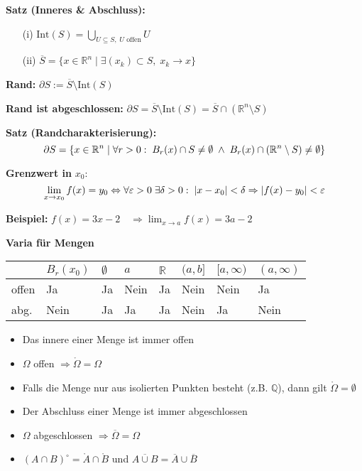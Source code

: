 \begin{itemize}
\textbf{Satz (Inneres \& Abschluss):}
\begin{itemize}
  \item[(i)] \(\displaystyle \text{Int}(S) = \bigcup_{U \subseteq S,\; U \text{ offen}} U\)
  \item[(ii)] \(\displaystyle \overline{S} = \{x \in \mathbb{R}^n \mid \exists (x_k) \subset S,\; x_k \to x\}\)
\end{itemize}

\textbf{Rand:}  
\(\partial S := \overline{S} \setminus \text{Int}(S)\)

\textbf{Rand ist abgeschlossen:}  
\(\partial S = \overline{S} \setminus \text{Int}(S) = \overline{S} \cap (\mathbb{R}^n \setminus S)\)

\textbf{Satz (Randcharakterisierung):}  
\[
\partial S = \{x \in \mathbb{R}^n \mid \forall r > 0: \\
\; B_r(x) \cap S \ne \emptyset \;\land\; B_r(x) \cap (\mathbb{R}^n \setminus S) \ne \emptyset \}
\]


\textbf{Grenzwert in } $x_0$:  
\[
\lim_{x \to x_0} f(x) = y_0 \Leftrightarrow
\forall \varepsilon > 0\; \exists \delta > 0: \\
\; |x - x_0| < \delta \Rightarrow |f(x) - y_0| < \varepsilon
\]

\textbf{Beispiel:}  
$f(x) = 3x - 2 \quad \Rightarrow \lim_{x \to a} f(x) = 3a - 2$

\textbf{Varia für Mengen}
\renewcommand{\arraystretch}{1.2}

\begin{center}
\begin{tabularx}{\linewidth}{l 
  >{\centering\arraybackslash}p{0.5cm} 
  >{\centering\arraybackslash}p{0.1cm} 
  >{\centering\arraybackslash}p{0.35cm} 
  >{\centering\arraybackslash}p{0.35cm} 
  >{\centering\arraybackslash}p{0.35cm} 
  >{\centering\arraybackslash}p{0.35cm} 
  >{\centering\arraybackslash}p{0.35cm}}
\toprule
& $B_r(x_0)$ & $\emptyset$ & $a$ & $\mathbb{R}$ & $(a,b]$ & $[a,\infty)$ & $(a,\infty)$ \\
\midrule
offen     & Ja   & Ja  & Nein & Ja  & Nein & Nein & Ja \\
abg. & Nein & Ja  & Ja   & Ja  & Nein & Ja   & Nein \\
\bottomrule
\end{tabularx}
\end{center}
\begin{itemize}[leftmargin=1.5em]
  \item Das innere einer Menge ist immer offen
  \item $\Omega$ offen $\Rightarrow \mathring{\Omega} = \Omega$
  \item Falls die Menge nur aus isolierten Punkten besteht (z.B. $\mathbb{Q}$), dann gilt $\mathring{\Omega} = \emptyset$
  \item Der Abschluss einer Menge ist immer abgeschlossen
  \item $\Omega$ abgeschlossen $\Rightarrow \overline{\Omega} = \Omega$
  \item $(A \cap B)^\circ = \mathring{A} \cap \mathring{B}$ \quad und \quad $\overline{A \cup B} = \overline{A} \cup \overline{B}$
\end{itemize}


\end{itemize}
